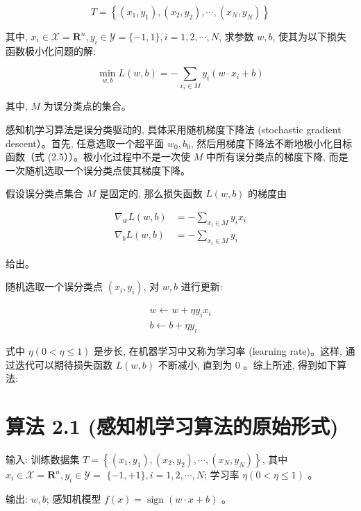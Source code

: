 \documentclass[10pt]{article}
\begin{document}
$$
T=\left\{\left(x_{1}, y_{1}\right),\left(x_{2}, y_{2}\right), \cdots,\left(x_{N}, y_{N}\right)\right\}
$$

其中, $x_{i} \in \mathcal{X}=\boldsymbol{R}^{n}, y_{i} \in \mathcal{Y}=\{-1,1\}, i=1,2, \cdots, N$, 求参数 $w, b$, 使其为以下损失函数极小化问题的解:


\begin{equation*}
\min _{w, b} L(w, b)=-\sum_{x_{i} \in M} y_{i}\left(w \cdot x_{i}+b\right) \tag{2.5}
\end{equation*}


其中, $M$ 为误分类点的集合。

感知机学习算法是误分类驱动的, 具体采用随机梯度下降法 (stochastic gradient descent）。首先, 任意选取一个超平面 $w_{0}, b_{0}$, 然后用梯度下降法不断地极小化目标函数（式 (2.5））。极小化过程中不是一次使 $M$ 中所有误分类点的梯度下降, 而是一次随机选取一个误分类点使其梯度下降。

假设误分类点集合 $M$ 是固定的, 那么损失函数 $L(w, b)$ 的梯度由

$$
\begin{aligned}
\nabla_{w} L(w, b) & =-\sum_{x_{i} \in M} y_{i} x_{i} \\
\nabla_{b} L(w, b) & =-\sum_{x_{i} \in M} y_{i}
\end{aligned}
$$

给出。

随机选取一个误分类点 $\left(x_{i}, y_{i}\right)$, 对 $w, b$ 进行更新:


\begin{gather*}
w \leftarrow w+\eta y_{i} x_{i}  \tag{2.6}\\
b \leftarrow b+\eta y_{i} \tag{2.7}
\end{gather*}


式中 $\eta(0<\eta \leqslant 1)$ 是步长, 在机器学习中又称为学习率 (learning rate)。这样, 通过迭代可以期待损失函数 $L(w, b)$ 不断减小, 直到为 0 。综上所述, 得到如下算法:

\section*{算法 2.1 (感知机学习算法的原始形式)}
输入: 训练数据集 $T=\left\{\left(x_{1}, y_{1}\right),\left(x_{2}, y_{2}\right), \cdots,\left(x_{N}, y_{N}\right)\right\}$, 其中 $x_{i} \in \mathcal{X}=\boldsymbol{R}^{n}, y_{i} \in \mathcal{Y}=$ $\{-1,+1\}, i=1,2, \cdots, N$; 学习率 $\eta(0<\eta \leqslant 1)$ 。

输出: $w, b$; 感知机模型 $f(x)=\operatorname{sign}(w \cdot x+b)$ 。
\end{document}
